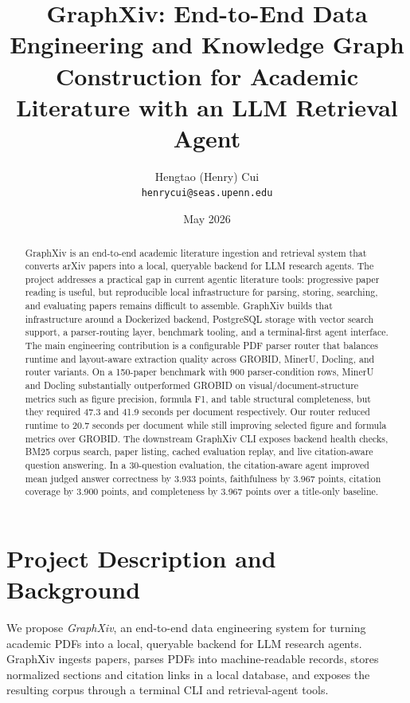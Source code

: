 \documentclass[10pt]{article}
\title{GraphXiv: End-to-End Data Engineering and Knowledge Graph Construction for Academic Literature with an LLM Retrieval Agent}
\author{Hengtao (Henry) Cui\\\texttt{henrycui@seas.upenn.edu}}
\date{May 2026}
\begin{document}
\maketitle

\begin{abstract}
GraphXiv is an end-to-end academic literature ingestion and retrieval system that converts arXiv papers into a local, queryable backend for LLM research agents. The project addresses a practical gap in current agentic literature tools: progressive paper reading is useful, but reproducible local infrastructure for parsing, storing, searching, and evaluating papers remains difficult to assemble. GraphXiv builds that infrastructure around a Dockerized backend, PostgreSQL storage with vector search support, a parser-routing layer, benchmark tooling, and a terminal-first agent interface. The main engineering contribution is a configurable PDF parser router that balances runtime and layout-aware extraction quality across GROBID, MinerU, Docling, and router variants. On a 150-paper benchmark with 900 parser-condition rows, MinerU and Docling substantially outperformed GROBID on visual/document-structure metrics such as figure precision, formula F1, and table structural completeness, but they required 47.3 and 41.9 seconds per document respectively. Our router reduced runtime to 20.7 seconds per document while still improving selected figure and formula metrics over GROBID. The downstream GraphXiv CLI exposes backend health checks, BM25 corpus search, paper listing, cached evaluation replay, and live citation-aware question answering. In a 30-question evaluation, the citation-aware agent improved mean judged answer correctness by 3.933 points, faithfulness by 3.967 points, citation coverage by 3.900 points, and completeness by 3.967 points over a title-only baseline.
\end{abstract}

\section{Project Description and Background}

We propose \textit{GraphXiv}, an end-to-end data engineering system for turning academic PDFs into a local, queryable backend for LLM research agents. GraphXiv ingests papers, parses PDFs into machine-readable records, stores normalized sections and citation links in a local database, and exposes the resulting corpus through a terminal CLI and retrieval-agent tools.
\end{document}

